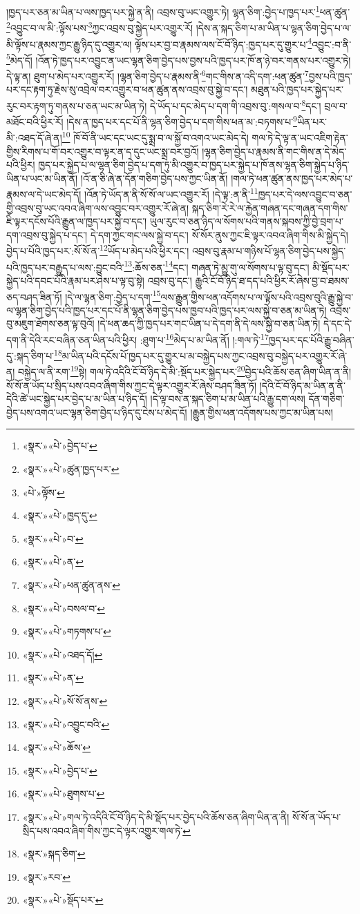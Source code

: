 །ཁྱད་པར་ཅན་མ་ཡིན་པ་ལས་ཁྱད་པར་སྐྱེ་ན་ནི། འབྲས་བུ་ཡང་འགྱུར་ཏེ། ལྷན་ཅིག་:བྱེད་པ་ཁྱད་པར་\footnote{«སྣར་»«པེ་»བྱེད་པ་}ཕན་ཚུན་\footnote{«སྣར་»«པེ་»ཚུན་ཁྱད་པར་}འབྱུང་བ་ལ་མི་:ལྟོས་པས་\footnote{«པེ་»ལྟོས་}ཀྱང་འབྲས་བུ་སྐྱེད་པར་འགྱུར་རོ། །དེས་ན་སྐད་ཅིག་པ་མ་ཡིན་པ་ལྷན་ཅིག་བྱེད་པ་ལ་མི་ལྟོས་པ་རྣམས་ཀྱང་རྒྱུ་ཉིད་དུ་འགྱུར་ལ། ལྟོས་པར་བྱ་བ་རྣམས་ལས་ངོ་བོ་ཉིད་:ཁྱད་པར་དུ་གྱུར་པ་\footnote{«སྣར་»«པེ་»ཁྱད་དུ་}འབྱུང་:བ་ནི་\footnote{«སྣར་»«པེ་»བ་}མེད་དོ། །འོན་ཏེ་ཁྱད་པར་འབྱུང་ན་ཡང་ལྷན་ཅིག་བྱེད་པས་བྱས་པའི་ཁྱད་པར་ཁོ་ན་ཉེ་བར་གནས་པར་འགྱུར་ཏེ། དེ་ལྟ་ན། ཐུག་པ་མེད་པར་འགྱུར་རོ། །ལྷན་ཅིག་བྱེད་པ་རྣམས་ནི་\footnote{«སྣར་»«པེ་»ན་}གང་གིས་ན་འདི་དག་:ཕན་ཚུན་\footnote{«སྣར་»«པེ་»ཕན་ཚུན་ནས་}བྱས་པའི་ཁྱད་པར་དང་རྟག་ཏུ་རྗེས་སུ་འབྲེལ་བར་འགྱུར་བ་ཕན་ཚུན་ནས་འབྲས་བུ་སྐྱེ་བ་དང་། མཐུན་པའི་ཁྱད་པར་སྐྱེད་པར་རུང་བར་རྟག་ཏུ་གནས་པ་ཅན་ཡང་མ་ཡིན་ཏེ། དེ་ཡོད་པ་དང་མེད་པ་དག་གི་འབྲས་བུ་:གསལ་བ་\footnote{«སྣར་»«པེ་»བསལ་བ་}དང་། བྲལ་བ་མཐོང་བའི་ཕྱིར་རོ། །དེས་ན་ཁྱད་པར་དང་པོ་ནི་ལྷན་ཅིག་བྱེད་པ་དག་གིས་ཕན་མ་:བཏགས་པ་\footnote{«སྣར་»«པེ་»གཏགས་པ་}ཡིན་པར་མི་:འཐད་དོ་ཞེ་ན།\footnote{«སྣར་»«པེ་»འཐད་དོ།} ཁོ་བོ་ནི་ཡང་དང་ཡང་དུ་སྨྲ་བ་ལ་སྐྱོ་བ་འགའ་ཡང་མེད་དེ། གལ་ཏེ་དེ་ལྟ་ན་ཡང་འཇིག་རྟེན་གྱིས་རིགས་པ་གོ་བར་འགྱུར་བ་ལྟར་ན་ད་དུང་ཡང་སྨྲ་བར་བྱའོ། །ལྷན་ཅིག་བྱེད་པ་རྣམས་ནི་གང་གིས་ན་དེ་མེད་པའི་ཕྱིར། ཁྱད་པར་སྐྱེད་པ་ལ་ལྷན་ཅིག་བྱེད་པ་དག་ཏུ་མི་འགྱུར་བ་ཁྱད་པར་སྐྱེད་པ་ཁོ་ནས་ལྷན་ཅིག་སྐྱེད་པ་ཉིད་ཡིན་པ་ཡང་མ་ཡིན་ནོ། །འོ་ན་ཅི་ཞེ་ན་དོན་གཅིག་བྱེད་པས་ཀྱང་ཡིན་ནོ། །གལ་ཏེ་ཕན་ཚུན་ནས་ཁྱད་པར་མེད་པ་རྣམས་ལ་དེ་ཡང་མེད་དོ། །འོན་ཏེ་ཡོད་ན་ནི་སོ་སོ་ལ་ཡང་འགྱུར་རོ། །དེ་ལྟ་:ན་ནི་\footnote{«སྣར་»«པེ་»ན་}ཁྱད་པར་དེ་ལས་འབྱུང་བ་ཅན་གྱི་འབྲས་བུ་ཡང་འབའ་ཞིག་ལས་འབྱུང་བར་འགྱུར་རོ་ཞེ་ན། སྐད་ཅིག་རེ་རེ་ལ་རྐྱེན་གཞན་དང་གཞན་དག་གིས་ཇི་ལྟར་དངོས་པོའི་རྒྱུན་ལ་ཁྱད་པར་སྐྱེ་བ་དང་། ཡུལ་རུང་བ་ཅན་ཉིད་ལ་སོགས་པའི་གནས་སྐབས་ཀྱི་བྱེ་བྲག་པ་དག་འབྲས་བུ་སྐྱེད་པ་དང་། དེ་དག་ཀྱང་གང་ལས་སྐྱེ་བ་དང་། སོ་སོར་ནུས་ཀྱང་ཇི་ལྟར་འབའ་ཞིག་གིས་མི་སྐྱེད་དེ། བྱེད་པ་པོའི་ཁྱད་པར་:སོ་སོ་ན་\footnote{«སྣར་»«པེ་»སོ་སོ་ནས་}ཡོད་པ་མེད་པའི་ཕྱིར་དང་། འབྲས་བུ་རྣམ་པ་གཉིས་པོ་ལྷན་ཅིག་བྱེད་པས་སྐྱེད་པའི་ཁྱད་པར་བརྒྱུད་པ་ལས་:བྱུང་བའི་\footnote{«སྣར་»«པེ་»འབྱུང་བའི་}:ཆོས་ཅན་\footnote{«སྣར་»«པེ་»ཆོས་}དང་། གཞན་ཏེ་མྱུ་གུ་ལ་སོགས་པ་ལྟ་བུ་དང་། མི་སྡོད་པར་སྐྱེད་པའི་དབང་པོའི་རྣམ་པར་ཤེས་པ་ལྟ་བུ་སྟེ། འབྲས་བུ་དང་། རྒྱུའི་ངོ་བོ་ཉིད་ཐ་དད་པའི་ཕྱིར་རོ་ཞེས་བྱ་བ་ཐམས་ཅད་བཤད་ཟིན་ཏོ། །དེ་ལ་ལྷན་ཅིག་:བྱེད་པ་དག་\footnote{«སྣར་»«པེ་»བྱེད་པ་}ལས་རྒྱུན་གྱིས་ཕན་འདོགས་པ་ལ་ལྟོས་པའི་འབྲས་བུའི་རྒྱུ་སྐྱེ་བ་ལ་ལྷན་ཅིག་བྱེད་པའི་ཁྱད་པར་དང་པོ་ནི་ལྷན་ཅིག་བྱེད་པས་ཁྱབ་པའི་ཁྱད་པར་ལས་སྐྱེ་བ་ཅན་མ་ཡིན་ཏེ། འབྲས་བུ་མཇུག་ཐོགས་ཅན་ལྟ་བུའོ། །དེ་ཕན་ཆད་ཀྱི་ཁྱད་པར་གང་ཡིན་པ་དེ་དག་ནི་དེ་ལས་སྐྱེ་བ་ཅན་ཡིན་ཏེ། དེ་དང་དེ་དག་ནི་དེའི་རང་བཞིན་ཅན་ཡིན་པའི་ཕྱིར། :ཐུག་པ་\footnote{«སྣར་»«པེ་»ཐུགས་པ་}མེད་པ་མ་ཡིན་ནོ། །:གལ་ཏེ་\footnote{«སྣར་»«པེ་»གལ་ཏེ་འདིའི་ངོ་བོ་ཉིད་དེ་མི་སྡོད་པར་བྱེད་པའི་ཆོས་ཅན་ཞིག་ཡིན་ན་ནི། སོ་སོ་ན་ཡོད་པ་སྲིད་པས་འབའ་ཞིག་གིས་ཀྱང་དེ་ལྟར་འགྱུར་གལ་ཏེ་}ཁྱད་པར་དང་པོའི་རྒྱུ་བཞིན་དུ་:སྐད་ཅིག་པ་\footnote{«སྣར་»སྐད་ཅིག་}མ་ཡིན་པའི་དངོས་པོ་ཁྱད་པར་དུ་གྱུར་པ་མ་བསྐྱེད་པས་ཀྱང་འབྲས་བུ་བསྐྱེད་པར་འགྱུར་རོ་ཞེ་ན། བསྐྱེད་ལ་ནི་རག་\footnote{«སྣར་»རབ་}སྟེ། གལ་ཏེ་འདིའི་ངོ་བོ་ཉིད་དེ་མི་:སྡོད་པར་སྐྱེད་པར་\footnote{«སྣར་»«པེ་»སྡོད་པར་}བྱེད་པའི་ཆོས་ཅན་ཞིག་ཡིན་ན་ནི། སོ་སོ་ན་ཡོད་པ་སྲིད་པས་འབའ་ཞིག་གིས་ཀྱང་དེ་ལྟར་འགྱུར་རོ་ཞེས་བཤད་ཟིན་ཏོ། །དེའི་ངོ་བོ་ཉིད་མ་ཡིན་ན་ནི་དེའི་ཚེ་ཡང་སྐྱེད་པར་བྱེད་པ་མ་ཡིན་པ་ཉིད་དོ། །དེ་ལྟ་བས་ན་སྐད་ཅིག་པ་མ་ཡིན་པའི་རྒྱུ་དག་ལས། དོན་གཅིག་བྱེད་པས་འགའ་ཡང་ལྷན་ཅིག་བྱེད་པ་ཉིད་དུ་ངེས་པ་མེད་དོ། །རྒྱུན་གྱིས་ཕན་འདོགས་པས་ཀྱང་མ་ཡིན་པས། 